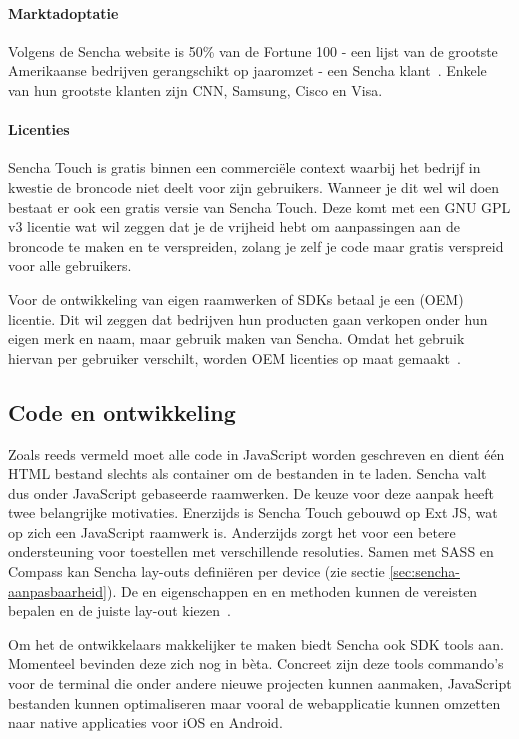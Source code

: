 \paragraph{Marktadoptatie}
Volgens de Sencha website is 50\% van de Fortune 100 - een lijst van de grootste Amerikaanse bedrijven gerangschikt op jaaromzet - een Sencha klant~\cite{Inc.}.  Enkele van hun grootste klanten zijn CNN,  Samsung,  Cisco en  Visa.

\paragraph{Licenties}
Sencha Touch is gratis binnen een commerciële context waarbij het bedrijf in kwestie de broncode niet deelt voor zijn gebruikers.  Wanneer je dit wel wil doen bestaat er ook een gratis  versie van Sencha Touch.  Deze komt met een GNU GPL v3  licentie wat wil zeggen dat je de vrijheid hebt om aanpassingen aan de broncode te maken en te verspreiden,  zolang je zelf je code maar gratis verspreid voor alle gebruikers.
  
Voor de ontwikkeling van eigen raamwerken of SDKs betaal je een  (OEM) licentie.  Dit wil zeggen dat bedrijven hun producten gaan verkopen onder hun eigen merk en naam, maar gebruik maken van Sencha.  Omdat het gebruik hiervan per gebruiker verschilt,  worden OEM licenties op maat gemaakt~\cite{Inc.}.

\subsection{Code en ontwikkeling}
Zoals reeds vermeld moet alle code in JavaScript worden geschreven en dient één HTML bestand slechts als container om de bestanden in te laden.  Sencha valt dus onder JavaScript gebaseerde raamwerken.  De keuze voor deze aanpak heeft twee belangrijke motivaties.  Enerzijds is Sencha Touch gebouwd op Ext JS,  wat op zich een JavaScript raamwerk is.  Anderzijds zorgt het voor een betere ondersteuning voor toestellen met verschillende resoluties.  Samen met SASS en Compass kan Sencha lay-outs definiëren per device (zie sectie \ref{sec:sencha-aanpasbaarheid}).  De  en  eigenschappen en  en  methoden kunnen de vereisten bepalen en de juiste lay-out kiezen~\cite{JohnEClark2012}.

Om het de ontwikkelaars makkelijker te maken biedt Sencha ook SDK tools aan.  Momenteel bevinden deze zich nog in bèta.  Concreet zijn deze tools commando's voor de terminal die onder andere nieuwe projecten kunnen aanmaken, JavaScript bestanden kunnen optimaliseren maar vooral de webapplicatie kunnen omzetten naar native applicaties voor iOS en Android.

